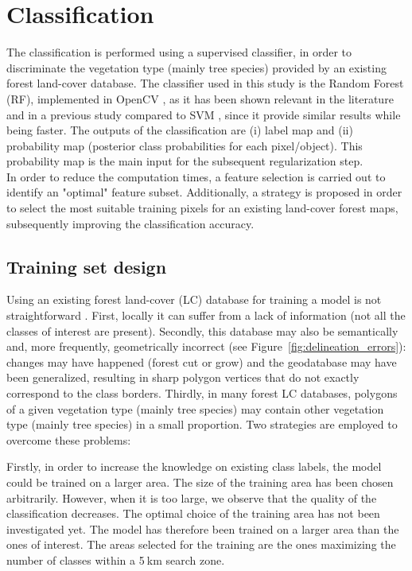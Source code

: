 \section{Classification}
The classification is performed using a supervised classifier, in order to discriminate the vegetation type (mainly tree species) provided by an existing forest land-cover database. The classifier used in this study is the Random Forest (RF), implemented in OpenCV \citep{opencv}, as it has been shown relevant in the literature \citep{belgiu2016random} and in a previous study compared to SVM \citep{dechesne2016forest}, since it provide similar results while being faster. The outputs of the classification are (i) label map and (ii) probability map (posterior class probabilities for each pixel/object). This probability map is the main input for the subsequent regularization step. \\
In order to reduce the computation times, a feature selection is carried out to identify an "optimal" feature subset. Additionally, a strategy is proposed in order to select the most suitable training pixels for an existing land-cover forest maps, subsequently improving the classification accuracy.

\subsection{Training set design}
Using an existing forest land-cover (LC) database for training a model is not straightforward \citep{isprsannals-II-3-W2-13-2013,rs6053965,isprs-annals-III-7-133-2016}. First, locally it can suffer from a lack of information (not all the classes of interest are present). Secondly, this database may also be semantically and, more frequently, geometrically incorrect (see Figure~\ref{fig:delineation_errors}): changes may have happened (forest cut or grow) and the geodatabase may have been generalized, resulting in sharp polygon vertices that do not exactly correspond to the class borders. Thirdly, in many forest LC databases, polygons of a given vegetation type (mainly tree species) may contain other vegetation type (mainly tree species) in a small proportion. Two strategies are employed to overcome these problems: 

Firstly, in order to increase the knowledge on existing class labels, the model could be trained on a larger area. The size of the training area has been chosen arbitrarily. However, when it is too large, we observe that the quality of the classification decreases. The optimal choice of the training area has not been investigated yet. {The model has therefore been trained on a larger area than the ones of interest}. The areas selected for the training are the ones maximizing the number of classes within a 5$\:$km search zone.

